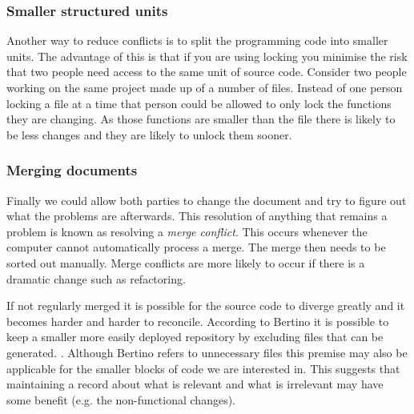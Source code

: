 \subsubsection{Smaller structured units}
Another way to reduce conflicts is to split the programming code into smaller units.  The advantage of this is that if you are using locking you minimise the risk that two people need access to the same unit of source code. Consider two people working on the same project made up of a number of files.  Instead of one person locking a file at a time that person could be allowed to only lock the functions they are changing. As those functions are smaller than the file there is likely to be less changes and they are likely to unlock them sooner.
\subsubsection{Merging documents}
Finally we could allow both parties to change the document and try to figure out what the problems are afterwards.  This resolution of anything that remains a problem is known as resolving a \emph{merge conflict}. This occurs whenever the computer cannot automatically process a merge.  The merge then needs to be sorted out manually. Merge conflicts are more likely to occur if there is a dramatic change such as refactoring.

If not regularly merged it is possible for the source code to diverge greatly and it becomes harder and harder to reconcile.
 According to Bertino it is possible to keep a smaller more easily deployed repository by excluding files that can be generated. \cite{Bertino2012}. Although Bertino refers to unnecessary files this premise may also be applicable for the smaller blocks of code we are interested in. This suggests that maintaining a record about what is relevant and what is irrelevant may have some benefit (e.g. the non-functional changes).
 
